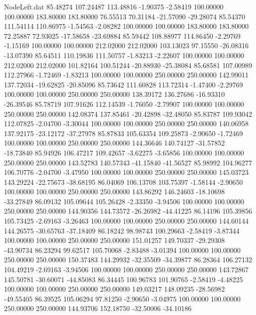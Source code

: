 \begin{filecontents}{NodeLeft.dat}
  85.48274  107.24487  113.48816    -1.90375   -2.58419  100.00000  100.00000  183.80000  183.80000   76.55513   70.31184  -21.57090  -29.28074
  85.54370  111.54114  110.86975    -1.54563   -2.08282  100.00000  100.00000  183.80000  183.80000   72.25887   72.93025  -17.58658  -23.69884
  85.59442  108.88977  114.86450    -2.29769   -1.15169  100.00000  100.00000  212.02000  212.02000  103.13023   97.15550  -26.08316  -13.07390
  85.64511  110.19836  111.50757    -1.83213   -2.22607  100.00000  100.00000  212.02000  212.02000  101.82164  100.51244  -20.88930  -25.38084
  85.68581  107.00989  112.27966    -1.72469   -1.83213  100.00000  100.00000  250.00000  250.00000  142.99011  137.72034  -19.62825  -20.85096
  85.73642  111.60828  113.72314    -1.47400   -2.29769  100.00000  100.00000  250.00000  250.00000  138.39172  136.27686  -16.93310  -26.39546
  85.78719  107.91626  112.14539    -1.76050   -2.79907  100.00000  100.00000  250.00000  250.00000  142.08374  137.85461  -20.42898  -32.48050
  85.83787  109.93042  112.07825    -2.04700   -3.30044  100.00000  100.00000  250.00000  250.00000  140.06958  137.92175  -23.12172  -37.27978
  85.87833  105.63354  109.25873    -2.90650   -1.72469  100.00000  100.00000  250.00000  250.00000  144.36646  140.74127  -31.57852  -18.73840
  85.94926  106.47217  109.42657    -3.62275   -3.65856  100.00000  100.00000  250.00000  250.00000  143.52783  140.57343  -41.15840  -41.56527
  85.98992  104.96277  106.70776    -2.04700   -3.47950  100.00000  100.00000  250.00000  250.00000  145.03723  143.29224  -22.75673  -38.68195
  86.04069  106.13708  103.75397    -1.58144   -2.90650  100.00000  100.00000  250.00000  250.00000  143.86292  146.24603  -18.10698  -33.27849
  86.09132  105.09644  105.26428    -2.33350   -3.94506  100.00000  100.00000  250.00000  250.00000  144.90356  144.73572  -26.26982  -44.41225
  86.14196  105.39856  105.73425    -2.69163   -3.26463  100.00000  100.00000  250.00000  250.00000  144.60144  144.26575  -30.65763  -37.18409
  86.18242   98.98743  100.29663    -2.58419   -3.87344  100.00000  100.00000  250.00000  250.00000  151.01257  149.70337  -29.29308  -43.90734
  86.23294   99.62517  105.70068    -2.83488   -3.01394  100.00000  100.00000  250.00000  250.00000  150.37483  144.29932  -32.35509  -34.39877
  86.28364  106.27132  104.49219    -2.69163   -3.94506  100.00000  100.00000  250.00000  250.00000  143.72867  145.50781  -30.60071  -44.85083
  86.34445  100.96783  101.90765    -2.58419   -4.48225  100.00000  100.00000  250.00000  250.00000  149.03217  148.09235  -28.56982  -49.55405
  86.39525  105.06294   97.81250    -2.90650   -3.04975  100.00000  100.00000  250.00000  250.00000  144.93706  152.18750  -32.50006  -34.10186

\end{filecontents}
